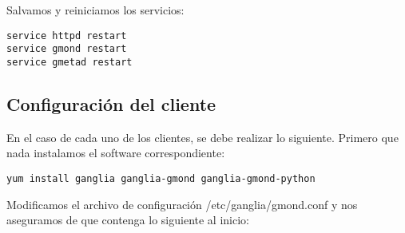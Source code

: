 Salvamos y reiniciamos los servicios:

\begin{lstlisting}
service httpd restart
service gmond restart
service gmetad restart
\end{lstlisting}

\subsection{Configuración del cliente}
En el caso de cada uno de los clientes, se debe realizar lo siguiente. Primero que nada instalamos el software correspondiente:

\begin{lstlisting}
yum install ganglia ganglia-gmond ganglia-gmond-python
\end{lstlisting}

Modificamos el archivo de configuración /etc/ganglia/gmond.conf y nos aseguramos de que contenga lo siguiente al inicio:

